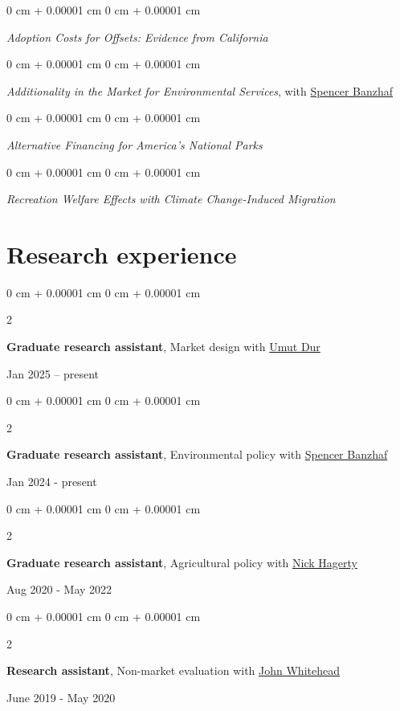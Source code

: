 \documentclass[11pt]{article}
\newenvironment{onecolentry}{
	\begin{adjustwidth}{
			0 cm + 0.00001 cm
		}{
			0 cm + 0.00001 cm
		}
	}{
	\end{adjustwidth}
} %
\newenvironment{twocolentry}[2][]{
	\onecolentry
	\def\secondColumn{#2}
	\setcolumnwidth{\fill, 4.5 cm}
	\begin{paracol}{2}
	}{
		\switchcolumn \raggedleft \secondColumn
	\end{paracol}
	\endonecolentry
} %
\begin{document}
\begin{onecolentry}
	\textit{Adoption Costs for Offsets: Evidence from California}
\end{onecolentry}

\begin{onecolentry}
	\textit{Additionality in the Market for Environmental Services}, with \href{https://spencerbanzhaf.wordpress.ncsu.edu/}{Spencer Banzhaf}
\end{onecolentry}

\begin{onecolentry}
	\textit{Alternative Financing for America’s National Parks}
\end{onecolentry}

\begin{onecolentry}
	\textit{Recreation Welfare Effects with Climate Change-Induced Migration}
\end{onecolentry}


\section{Research experience}


\begin{twocolentry}{Jan 2025 – present}
	\textbf{Graduate research assistant},
	Market design with \href{https://sites.google.com/site/umutdur/}{Umut Dur}
\end{twocolentry}

\vspace{0.10 cm}

\begin{twocolentry}{Jan 2024 - present}
	\textbf{Graduate research assistant},
	Environmental policy with \href{https://spencerbanzhaf.wordpress.ncsu.edu/}{Spencer Banzhaf}
\end{twocolentry}

\vspace{0.10 cm}

\begin{twocolentry}{Aug 2020 - May 2022}
	\textbf{Graduate research assistant},
	Agricultural policy with \href{https://www.nickhagerty.com/}{Nick Hagerty}
\end{twocolentry}

\vspace{0.10 cm}

\begin{twocolentry}{June 2019 - May 2020}
	\textbf{Research assistant},
	Non-market evaluation with \href{https://economics.appstate.edu/directory/john-whitehead-phd}{John Whitehead}
\end{twocolentry}
\end{document}
